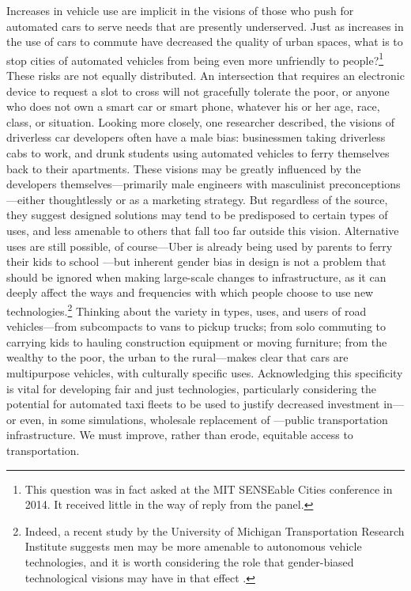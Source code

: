 Increases in vehicle use are
implicit in the visions of those who push for automated cars to serve needs that are presently
underserved. Just as increases in the use of cars to commute have
decreased the quality of urban spaces, what is to stop cities of
automated vehicles from
being even more unfriendly to
people?\footnote{This question was in fact asked at the MIT SENSEable Cities
conference in 2014. It received little in the way of reply from the
panel.} These risks are not equally distributed. An intersection that requires
an electronic device to request a slot 
to cross will not gracefully tolerate the poor, or anyone who
does not own a smart car or smart phone, whatever his or her age,
race, class, or situation. Looking more closely, one researcher
described, the visions
of driverless car developers
often have a male bias: businessmen
taking driverless cabs to work, and drunk students using
automated vehicles to ferry themselves 
back to their apartments. These visions may be greatly influenced by
the developers themselves---primarily male engineers with masculinist
preconceptions---either thoughtlessly or as a marketing strategy. But
regardless of the source, they suggest designed solutions may tend to
be predisposed to certain types of uses, and less amenable to others
that fall too far outside this vision. Alternative uses are still
possible, of course---Uber is already being used by parents to ferry
their kids to school \cite{hoderParents} \cite{shapiroVan}---but
inherent gender bias in design is not a problem that should be ignored 
when making large-scale changes to infrastructure, as it can deeply
affect the ways and frequencies with which people choose to use new
technologies.\footnote{Indeed, a recent study by the University of Michigan
Transportation Research Institute suggests men may be more
amenable to autonomous vehicle technologies, and it is worth
considering the role that gender-biased technological visions may have
in that
effect \cite{miglioreWomen}.}
Thinking about the variety in types, uses, and users of road vehicles---from
subcompacts to vans to pickup trucks; from solo commuting to carrying kids to
hauling construction equipment or moving furniture; from the wealthy
to the poor, the urban to the rural---makes clear that cars are
multipurpose vehicles, with culturally specific uses.
Acknowledging this
specificity is vital for developing fair and just technologies,
particularly
considering the potential for automated taxi fleets to 
be used to justify decreased investment in---or even, in some
simulations, wholesale replacement of
\cite{frazzoliSingapore}---public transportation infrastructure. We must
improve, rather than erode, equitable access to transportation.


